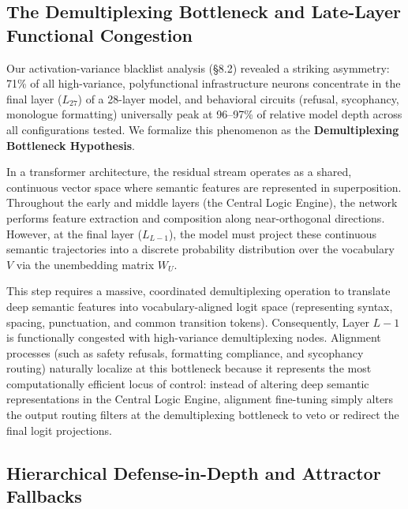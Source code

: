 \documentclass[11pt]{article}
\begin{document}
\subsection{The Demultiplexing Bottleneck and Late-Layer Functional Congestion}

Our activation-variance blacklist analysis (§8.2) revealed a striking asymmetry: 71\% of all high-variance, polyfunctional infrastructure neurons concentrate in the final layer ($L_{27}$) of a 28-layer model, and behavioral circuits (refusal, sycophancy, monologue formatting) universally peak at 96--97\% of relative model depth across all configurations tested. We formalize this phenomenon as the \textbf{Demultiplexing Bottleneck Hypothesis}.

In a transformer architecture, the residual stream operates as a shared, continuous vector space where semantic features are represented in superposition. Throughout the early and middle layers (the Central Logic Engine), the network performs feature extraction and composition along near-orthogonal directions. However, at the final layer ($L_{L-1}$), the model must project these continuous semantic trajectories into a discrete probability distribution over the vocabulary $V$ via the unembedding matrix $W_U$.

This step requires a massive, coordinated demultiplexing operation to translate deep semantic features into vocabulary-aligned logit space (representing syntax, spacing, punctuation, and common transition tokens). Consequently, Layer $L-1$ is functionally congested with high-variance demultiplexing nodes. Alignment processes (such as safety refusals, formatting compliance, and sycophancy routing) naturally localize at this bottleneck because it represents the most computationally efficient locus of control: instead of altering deep semantic representations in the Central Logic Engine, alignment fine-tuning simply alters the output routing filters at the demultiplexing bottleneck to veto or redirect the final logit projections.

\subsection{Hierarchical Defense-in-Depth and Attractor Fallbacks}
\end{document}
